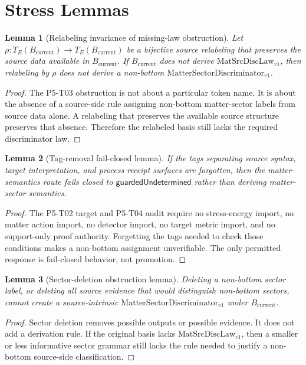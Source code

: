 \documentclass[11pt]{article}
\newcommand{\MatSrcDiscLaw}{\mathrm{MatSrcDiscLaw}_{v1}}
\newcommand{\MatterDisc}{\mathrm{MatterSectorDiscriminator}_{v1}}
\newcommand{\Bcur}{B_{\mathrm{current}}}
\newcommand{\Guarded}{\mathsf{guardedUndetermined}}
\newtheorem{lemma}{Lemma}
\begin{document}
\section{Stress Lemmas}

\begin{lemma}[Relabeling invariance of missing-law obstruction]
Let \(\rho:T_E(\Bcur)\to T_E(\Bcur)\) be a bijective source relabeling that
preserves the source data available in \(\Bcur\). If \(\Bcur\) does not derive
\(\MatSrcDiscLaw\), then relabeling by \(\rho\) does not derive a non-bottom
\(\MatterDisc\).
\end{lemma}

\begin{proof}
The P5-T03 obstruction is not about a particular token name. It is about the
absence of a source-side rule assigning non-bottom matter-sector labels from
source data alone. A relabeling that preserves the available source structure
preserves that absence. Therefore the relabeled basis still lacks the
required discriminator law.
\end{proof}

\begin{lemma}[Tag-removal fail-closed lemma]
If the tags separating source syntax, target interpretation, and process
receipt surfaces are forgotten, then the matter-semantics route fails closed
to \(\Guarded\) rather than deriving matter-sector semantics.
\end{lemma}

\begin{proof}
The P5-T02 target and P5-T04 audit require no stress-energy import, no matter
action import, no detector import, no target metric import, and no
support-only proof authority. Forgetting the tags needed to check those
conditions makes a non-bottom assignment unverifiable. The only permitted
response is fail-closed behavior, not promotion.
\end{proof}

\begin{lemma}[Sector-deletion obstruction lemma]
Deleting a non-bottom sector label, or deleting all source evidence that would
distinguish non-bottom sectors, cannot create a source-intrinsic
\(\MatterDisc\) under \(\Bcur\).
\end{lemma}

\begin{proof}
Sector deletion removes possible outputs or possible evidence. It does not
add a derivation rule. If the original basis lacks \(\MatSrcDiscLaw\), then a
smaller or less informative sector grammar still lacks the rule needed to
justify a non-bottom source-side classification.
\end{proof}
\end{document}
